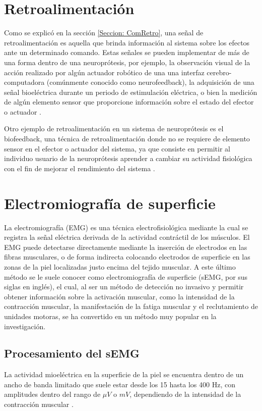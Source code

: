 \section{Retroalimentación}\label{Seccion: Retro}
Como se explicó en la sección \ref{Seccion: ComRetro}, una señal de retroalimentación es aquella que brinda información al sistema sobre los efectos ante un determinado comando. Estas señales se pueden implementar de más de una forma dentro de una neuroprótesis, por ejemplo, la observación visual de la acción realizado por algún actuador robótico de una una interfaz cerebro-computadora (comúnmente conocido como neurofeedback), la adquisición de una señal bioeléctrica durante un periodo de estimulación eléctrica, o bien la medición de algún elemento sensor que proporcione información sobre el estado del efector o actuador \cite{Wright2016}.

Otro ejemplo de retroalimentación en un sistema de neuroprótesis es el biofeedback, una técnica de retroalimentación donde no se requiere de elemento sensor en el efector o actuador del sistema, ya que consiste en permitir al individuo usuario de la neuroprótesis aprender a cambiar su actividad fisiológica con el fin de mejorar el rendimiento del sistema \cite{Yucha2008}.

\section{Electromiografía de superficie}
La electromiografía (EMG) es una técnica electrofisiológica mediante la cual se registra la señal eléctrica derivada de la actividad contráctil de los músculos. El EMG puede detectarse directamente mediante la inserción de electrodos en las fibras musculares, o de forma indirecta colocando electrodos de superficie en las zonas de la piel localizadas justo encima del tejido muscular. A este último método se le suele conocer como electromiografía de superficie (sEMG, por sus siglas en inglés), el cual, al ser un método de detección no invasivo y permitir obtener información sobre la activación muscular, como la intensidad de la contracción muscular, la manifestación de la fatiga muscular y el reclutamiento de unidades motoras, se ha convertido en un método muy popular en la investigación.

\subsection{Procesamiento del sEMG}
La actividad mioeléctrica en la superficie de la piel se encuentra dentro de un ancho de banda limitado que suele estar desde los 15 hasta los 400 Hz, con amplitudes dentro del rango de $\mu V$ o $mV$, dependiendo de la intensidad de la contracción muscular \cite{Cavalcanti-Garcia2009}.

